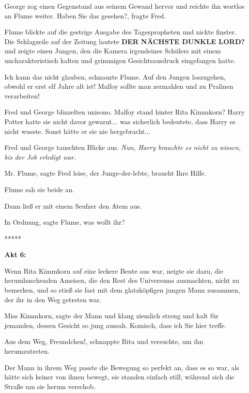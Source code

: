 George zog einen Gegenstand aus seinem Gewand hervor und reichte ihn wortlos an
Flume weiter. \glqq{}Haben Sie das gesehen?\grqq{}, fragte Fred.

Flume blickte auf die gestrige Ausgabe des Tagespropheten und nickte finster.
Die Schlagzeile auf der Zeitung lautete \textbf{DER NÄCHSTE DUNKLE LORD?} und
zeigte einen Jungen, den die Kamera irgendeines Schülers mit einem
uncharakteristisch kalten und grimmigen Gesichtsausdruck eingefangen hatte.

\glqq{}Ich kann das nicht glauben\grqq{}, schnauzte Flume. \glqq{}Auf den Jungen
loszugehen, obwohl er erst elf Jahre alt ist! Malfoy sollte man zermahlen und zu
Pralinen verarbeiten!\grqq{}

Fred und George blinzelten unisono. Malfoy stand hinter Rita Kimmkorn? Harry
Potter hatte sie nicht davor gewarnt... was sicherlich bedeutete, dass Harry es
nicht wusste. Sonst hätte er sie nie hergebracht...

Fred und George tauschten Blicke aus. \emph{Nun, Harry brauchte es nicht zu
wissen, bis der Job erledigt war.}

\glqq{}Mr. Flume\grqq{}, sagte Fred leise, \glqq{}der Junge-der-lebte, braucht
Ihre Hilfe.\grqq{}

Flume sah sie beide an.

Dann ließ er mit einem Seufzer den Atem aus.

\glqq{}In Ordnung\grqq{}, sagte Flume, \glqq{}was wollt ihr?\grqq{}

\begin{center}*****\end{center}

\textbf{Akt 6:}

Wenn Rita Kimmkorn auf eine leckere Beute aus war, neigte sie dazu, die
herumhuschenden Ameisen, die den Rest des Universums ausmachten, nicht zu
bemerken, und so stieß sie fast mit dem glatzköpfigen jungen Mann zusammen, der
ihr in den Weg getreten war.

\glqq{}Miss Kimmkorn\grqq{}, sagte der Mann und klang ziemlich streng und kalt
für jemanden, dessen Gesicht so jung aussah. \glqq{}Komisch, dass ich Sie hier
treffe.\grqq{}

\glqq{}Aus dem Weg, Freundchen!\grqq{}, schnappte Rita und versuchte, um ihn
herumzutreten.

Der Mann in ihrem Weg passte die Bewegung so perfekt an, dass es so war, als
hätte sich keiner von ihnen bewegt, sie standen einfach still, während sich die
Straße um sie herum verschob.

